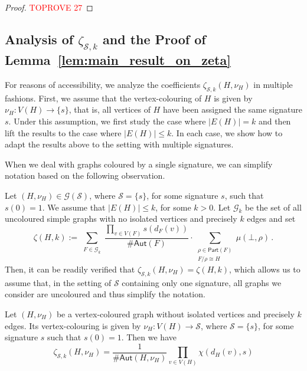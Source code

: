 \documentclass[authorcolumns,numberwithinsect]{no-lipics-v2022}
\begin{document}
\begin{proof}\textcolor{red}{TOPROVE 27}\end{proof}

\subsection{Analysis of $\zeta_{\mathcal{S},k}$ and the Proof of Lemma~\ref{lem:main_result_on_zeta}}\label{sec:analysis_of_zeta}

For reasons of accessibility, we analyze the coefficients $\zeta_{\mathcal{S}, k}(H, \nu_H)$ in multiple fashions. First, we assume that the vertex-colouring of $H$ is given by $\nu_H : V(H) \to \{s\}$, that is, all vertices of $H$ have been assigned the same signature $s$. Under this assumption, we first study the case where $|E(H)| = k$ and then lift the results to the case where $|E(H)| \leq k$. In each case, we show how to adapt the results above to the setting with multiple signatures. 

When we deal with graphs coloured by a single signature, we can simplify notation based on the following observation. 

\begin{remark}\label{rem:simplified_single_signature}
Let $(H, \nu_H) \in \mathcal{G}(\mathcal{S})$, where $\mathcal{S} = \{s\}$, for some signature $s$, such that $s(0) = 1$. We assume that $|E(H)| \leq k$, for some $k > 0$. Let $\mathcal{G}_k$ be the set of all uncoloured simple graphs with no isolated vertices and precisely $k$ edges and set
\[\zeta(H, k):= \sum_{\substack{F\in \mathcal{G}_k}} \frac{\prod_{v\in V(F)}{s(d_F(v))}}{\#\mathsf{Aut}(F)} \cdot \sum_{\substack{\rho \in \mathsf{Part}(F)\\F/\rho \cong H}}\mu(\bot,\rho)  \,.\]
Then, it can be readily verified that $\zeta_{\mathcal{S}, k}(H, \nu_H) = \zeta(H, k)$, which allows us to assume that, in the setting of $\mathcal{S}$ containing only one signature, all graphs we consider are uncoloured and thus simplify the notation.
\end{remark}

\begin{theorem} \label{Thm:special_case}
Let $(H, \nu_H)$ be a vertex-coloured graph without isolated vertices and precisely $k$ edges. Its vertex-colouring is given by $\nu_H : V(H) \to \mathcal{S}$, where $\mathcal{S} = \{s\}$, for some signature $s$ such that $s(0) = 1$. Then we have
\begin{equation}
    \zeta_{\mathcal{S}, k}(H,\nu_H)=\frac{1}{\#\mathsf{Aut}(H, \nu_H)}\prod_{v \in V(H)} \chi(d_H(v), s)
\end{equation}
\end{theorem}
\end{document}
